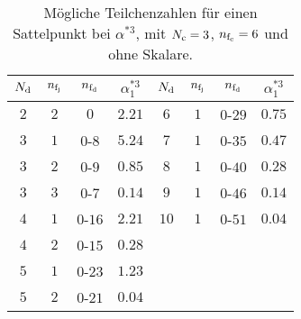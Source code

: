 \begin{table}[h]
\centering
 \begin{tabular}{ccc|c||ccc|c}
 \toprule \midrule
 $N_\text{d}$ 	& $n_{\text{f}_\text{j}}$ 	& $n_{\text{f}_\text{d}}$ 	& $\alpha^{*3}_1$ & $N_\text{d}$ 	& $n_{\text{f}_\text{j}}$ 	& $n_{\text{f}_\text{d}}$ 	& $\alpha^{*3}_1$		 \\
 \midrule 
 $2$	& $2$		& $0$			& $2.21$  & $6$		& $1$	& $0$-$29$	& $0.75$	\\
 $3$	& $1$		& $0$-$8$		& $5.24$  & $7$		& $1$	& $0$-$35$	& $0.47$	\\
 $3$	& $2$		& $0$-$9$		& $0.85$  & $8$		& $1$	& $0$-$40$	& $0.28$	\\
 $3$	& $3$		& $0$-$7$		& $0.14$  & $9$		& $1$	& $0$-$46$	& $0.14$	\\
 $4$	& $1$		& $0$-$16$		& $2.21$  & $10$	& $1$	& $0$-$51$	& $0.04$	\\
 $4$	& $2$		& $0$-$15$		& $0.28$   		\\
 $5$	& $1$		& $0$-$23$		& $1.23$   		\\
 $5$	& $2$		& $0$-$21$		& $0.04$  		\\
 \midrule \bottomrule
 \end{tabular}
\caption{Mögliche Teilchenzahlen für einen Sattelpunkt bei $\alpha^{*3}$, mit $N_\text{c}=3$, $n_{\text{f}_\text{c}}=6$ und ohne Skalare.}
\label{tab:beta_QCDxdQCD:Fix3_ohne_Skalare}
\end{table}

